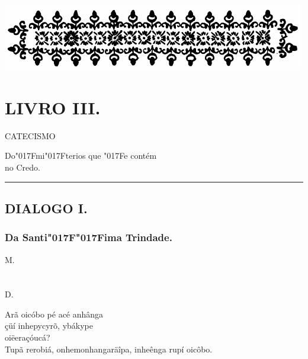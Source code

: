 \documentclass[openany,titlepage,12pt]{book}
\renewcommand{\chaptermark}[1]{\markboth{#1}{}}
\renewcommand{\sectionmark}[1]{\gdef\rightmark{#1}}
\newcommand{\lgS}{\char"017F}
\newcommand{\lgSS}{\char"017F\char"017F}
\begin{document}
\begin{center}
    \vspace*{20pt}
    \includegraphics[scale=0.33]{12.livro3.png}
\end{center}
\unskip
\vspace{-30pt}
{\let\clearpage\relax \chapter{\Huge LIVRO III.}}
\unskip
\vspace{-2pt}
\begin{center}
    {\large CATECISMO}
\end{center}
\unskip
\begin{center}
    Do\lgS mi\lgS terios que \lgS e contém\\
    no Credo.
\end{center}
\unskip
\par\noindent\rule{\textwidth}{0.4pt}
\unskip\vspace{-3pt}
\section{DIALOGO I.}
\unskip\vspace{-3pt}
\subsection{Da Santi\lgSS ima Trindade.}
\chaptermark{Dialogo I.}
\sectionmark{Da Santi\lgSS ima Trindade.}

\hspace{-10pt}
\begin{minipage}[t]{0.03\linewidth}
    M.\\ \\ \\D.\\ 
\end{minipage}
\begin{minipage}[t]{1.08\linewidth}
    \lettrine
    [findent =-2pt, nindent=0pt, loversize=-0.2, lraise=0.05, lines=5]
    {}{A}rã oicóbo pé acé anhânga\\
    \hspace*{2ex}çüí inhepycyrõ, ybákype\\
    \hspace*{2ex}oiëeraçóucá?\\
    Tupã rerobiá, onhemonhangaräîpa, inheênga rupí oicôbo.
\end{minipage}\\
\end{document}
